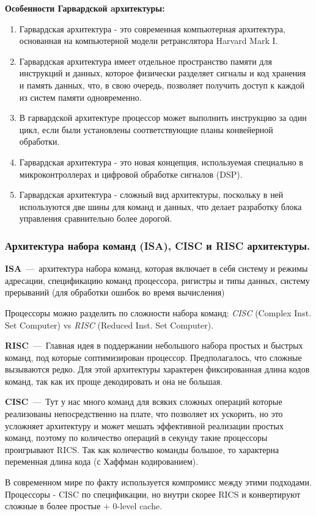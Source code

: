 \textbf{Особенности Гарвардской aрхитектуры:}
\begin{enumerate}
	\item Гарвардская архитектура - это современная компьютерная архитектура, основанная на компьютерной модели ретранслятора Harvard Mark I.
	\item Гарвардская архитектура имеет отдельное пространство памяти для инструкций и данных, которое физически разделяет сигналы и код хранения и память данных, что, в свою очередь, позволяет получить доступ к каждой из систем памяти одновременно.
	\item В гарвардской архитектуре процессор может выполнить инструкцию за один цикл, если были установлены соответствующие планы конвейерной обработки.
	\item Гарвардская архитектура - это новая концепция, используемая специально в микроконтроллерах и цифровой обработке сигналов (DSP).
	\item Гарвардская архитектура - сложный вид архитектуры, поскольку в ней используются две шины для команд и данных, что делает разработку блока управления сравнительно более дорогой.
\end{enumerate}

\subsubsection{Архитектура набора команд (ISA), CISC и RISC архитектуры.}

\textbf{ISA}~---~архитектура набора команд, которая включает в себя систему и режимы адресации, спецификацию команд процессора, ригистры и типы данных, систему прерываний (для обработки ошибок во время вычисления)

Процессоры можно разделить по сложности набора команд:
\emph{CISC} (Complex Inst. Set Computer) vs \emph{RISC} (Reduced Inst. Set Computer).

\textbf{RISC}~---~Главная идея в поддержании небольшого набора простых и быстрых команд, под которые соптимизирован процессор. Предполагалось, что  сложные вызываются редко. Для этой архитектуры характерен фиксированная длина кодов команд, так как их проще декодировать и она не большая.

\textbf{CISC}~---~Тут у нас много команд для всяких сложных операций которые реализованы непосредственно на плате, что позволяет их ускорить, но это усложняет архитектуру и может мешать эффективной реализации простых команд, поэтому по количество операций в секунду такие процессоры проигрывают RICS. Так как количество команды большое, то характерна переменная длина кода (с Хаффман кодированием).

В современном мире по факту используется компромисс между этими подходами. Процессоры - CISC по спецификации, но внутри скорее RICS и конвертируют сложные в более простые + 0-level cache.